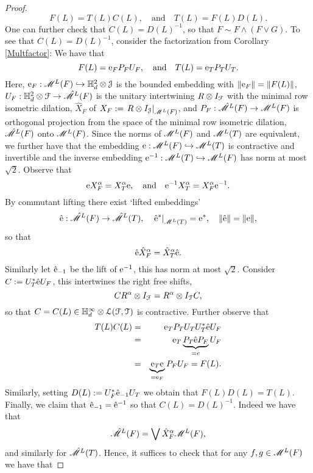 \documentclass[11pt]{article}
\newcommand{\ba}{\begin{eqnarray}}
\newcommand{\ea}{\end{eqnarray}}
\newcommand{\nn}{\nonumber}
\newcommand{\mr}{\ensuremath{\mathrm}}
\newcommand{\scr}{\ensuremath{\mathscr}}
\newcommand{\mc}{\ensuremath{\mathcal}}
\def\bH{\mathbb{H}}
\def\cJ{\mathcal{J}}
\numberwithin{equation}{section}
\numberwithin{subsection}{section}
\theoremstyle{definition}
\begin{document}
\begin{proof}
$$ F(L) = T(L) C(L), \quad \mbox{and} \quad T(L) = F(L) D(L). $$ One can further check that $C(L) = D(L) ^{-1}$, so that $F \sim F \wedge (F \vee G)$. To see that $C(L) = D(L) ^{-1}$, consider the factorization from Corollary \ref{Multfactor}: We have that
$$ F(L) = \mr{e} _F P_F U_F, \quad \mbox{and} \quad T(L) = \mr{e} _T P_T U_T.$$ Here, $\mr{e} _F : \scr{M} ^L (F ) \hookrightarrow \bH ^2 _d \otimes \cJ$ is the bounded embedding with $\| \mr{e} _F \| = \| F(L) \|$, $U_F : \bH ^2 _d \otimes \mc{F} \rightarrow \hat{\scr{M}} ^L (F)$ is the unitary intertwining $R \otimes I _{\mc{F}}$ with the minimal row isometric dilation, $\hat{X} _F $ of $X_F := \left. R \otimes I_{\cJ} \right| _{\scr{M} ^L (F)}$, and $P_F : \hat{\scr{M}} ^L (F) \rightarrow \scr{M} ^L (F)$ is orthogonal projection from the space of the minimal row isometric dilation, $\hat{\scr{M} } ^L (F)$ onto $\scr{M} ^L (F)$. 
Since the norms of $\scr{M} ^L (F)$ and $\scr{M} ^L (T)$ are equivalent, we further have that the embedding $\mr{e} : \scr{M} ^L (F) \hookrightarrow \scr{M} ^L (T)$ is contractive and invertible and the inverse embedding $\mr{e} ^{-1} : \scr{M} ^L (T) \hookrightarrow \scr{M} ^L (F)$ has norm at most $\sqrt{2}$. Observe that 
$$ \mr{e} X_F ^\alpha = X_T ^\alpha \mr{e}, \quad \mbox{and} \quad \mr{e} ^{-1} X_T ^\alpha = X_F ^\alpha \mr{e} ^{-1}. $$ By commutant lifting there exist `lifted embeddings' $$ \hat{\mr{e}} : \hat{\scr{M}} ^L (F) \rightarrow \hat{\scr{M}} ^L (T), \quad  \left. \hat{\mr{e}} ^* \right| _{\scr{M} ^L (T)} = \mr{e} ^*, \quad \| \hat{\mr{e}} \| = \| \mr{e} \|, $$ so that 
$$ \hat{\mr{e}} \hat{X} _F ^\alpha = \hat{X} _T ^\alpha \hat{\mr{e}}. $$ Similarly let $\hat{\mr{e}} _{-1}$ be the lift of $\mr{e} ^{-1}$, this has norm at most $\sqrt{2}$. Consider $C := U_T ^* \hat{\mr{e}} U_F$, this intertwines the right free shifts, 
$$ C R ^\alpha \otimes I_{\mc{F}} = R ^\alpha \otimes I _{\mc{T}} C, $$ so that $C =C(L) \in \bH ^\infty _d \otimes \mc{L} (\mc{F} , \mc{T} )$ is contractive. Further observe that 
\ba T(L) C(L) & = & \mr{e} _T P _T U_T U_T ^* \hat{\mr{e}} U_F \nn \\
& = & \mr{e} _T \underbrace{P_T \hat{\mr{e}} P_F}_{= e} U_F \nn \\
& = & \underbrace{\mr{e} _T \mr{e}}_{=\mr{e} _F} P_F U_F = F(L). \nn \ea
Similarly, setting $D(L) := U_F ^* \hat{\mr{e}} _{-1} U_T$ we obtain that $F(L) D(L) = T(L)$. Finally, we claim that $\hat{\mr{e}} _{-1} = \hat{\mr{e}} ^{-1}$ so that $C(L) = D(L) ^{-1}$. Indeed we have that 
$$ \hat{\scr{M}} ^L (F) = \bigvee \hat{X} _F ^\alpha \scr{M} ^L (F), $$ and similarly for $\hat{\scr{M}} ^L (T)$. Hence, it suffices to check that for any $f, g \in \scr{M} ^L (F)$ we have that

\end{proof}
\end{document}
